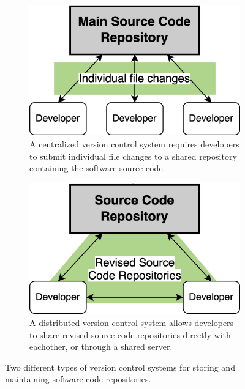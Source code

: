 \documentclass{article}
\begin{document}
\begin{figure}
    \begin{subfigure}[c][][c]{0.45\textwidth}
        \begin{center}
            \includegraphics[width=\textwidth]{png/centralized-vcs.png}
            \caption{
                \centering 
                A centralized version control system requires developers to submit individual file changes to a shared repository containing the software source code.
            }
            \label{fig:centralized-vcs}
        \end{center}
    \end{subfigure}
    \hspace{0.05\textwidth} 
    \begin{subfigure}[c][][c]{0.45\textwidth}
        \begin{center}
            \includegraphics[width=\textwidth]{png/distributed-vcs.png}
            \caption{
                \centering 
                A distributed version control system allows developers to share revised source code repositories directly with eachother, or through a shared server.
            }
            \label{fig:distributed-vcs}
        \end{center}
    \end{subfigure}
    \caption{
        \centering
        Two different types of version control systems for storing and maintaining software code repositories.
    }
    \label{fig:version-control-systems}
\end{figure}
\end{document}
